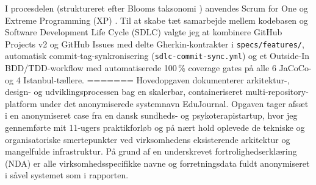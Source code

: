 \documentclass[11pt,a4paper]{article}
\begin{document}
\begin{titlepage}
\begin{minipage}{0.92\textwidth}
        I procesdelen (struktureret efter Blooms taksonomi \cite{bloom1956}) anvendes Scrum for One \cite{schwaber2020} og Extreme Programming (XP) \cite{beck2004}. Til at skabe tæt samarbejde mellem kodebasen og Software Development Life Cycle (SDLC) valgte jeg at kombinere GitHub Projects v2 og GitHub Issues med delte Gherkin-kontrakter i \texttt{specs/features/}, automatisk commit-tag-synkronisering (\texttt{sdlc-commit-sync.yml}) og et Outside-In BDD/TDD-workflow med automatiserede 100\,\% coverage gates på alle 6 JaCoCo- og 4 Istanbul-tællere.
=======
        Hovedopgaven dokumenterer arkitektur-, design- og udviklingsprocessen bag en skalerbar, containeriseret multi-repository-platform under det anonymiserede systemnavn EduJournal. Opgaven tager afsæt i en anonymiseret case fra en dansk sundheds- og psykoterapistartup, hvor jeg gennemførte mit 11-ugers praktikforløb og på nært hold oplevede de tekniske og organisatoriske smertepunkter ved virksomhedens eksisterende arkitektur og mangelfulde infrastruktur. På grund af en underskrevet fortrolighedserklæring (NDA) er alle virksomhedsspecifikke navne og forretningsdata fuldt anonymiseret i såvel systemet som i rapporten.
        \newline

\end{minipage}
\end{titlepage}
\end{document}

